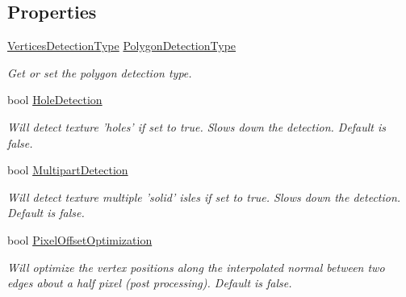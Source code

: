 \subsection*{Properties}
\begin{DoxyCompactItemize}
\item 
\hyperlink{namespace_farseer_physics_1_1_common_1_1_texture_tools_a8c78f960d4da62793329adae2e15d451}{Vertices\+Detection\+Type} \hyperlink{class_farseer_physics_1_1_common_1_1_texture_tools_1_1_texture_converter_a916cf6fed1888505c4a78805de1ae29e}{Polygon\+Detection\+Type}
\begin{DoxyCompactList}\small\item\em Get or set the polygon detection type. \end{DoxyCompactList}\item 
bool \hyperlink{class_farseer_physics_1_1_common_1_1_texture_tools_1_1_texture_converter_a71f8b7b1315b5a7f050cccd090319602}{Hole\+Detection}
\begin{DoxyCompactList}\small\item\em Will detect texture 'holes' if set to true. Slows down the detection. Default is false. \end{DoxyCompactList}\item 
bool \hyperlink{class_farseer_physics_1_1_common_1_1_texture_tools_1_1_texture_converter_a7569532d4e5404d05a1942531b00702c}{Multipart\+Detection}
\begin{DoxyCompactList}\small\item\em Will detect texture multiple 'solid' isles if set to true. Slows down the detection. Default is false. \end{DoxyCompactList}\item 
bool \hyperlink{class_farseer_physics_1_1_common_1_1_texture_tools_1_1_texture_converter_a0915e8529d7d750eb57500f1e4933b22}{Pixel\+Offset\+Optimization}
\begin{DoxyCompactList}\small\item\em Will optimize the vertex positions along the interpolated normal between two edges about a half pixel (post processing). Default is false. \end{DoxyCompactList}\item 

\end{DoxyCompactItemize}
